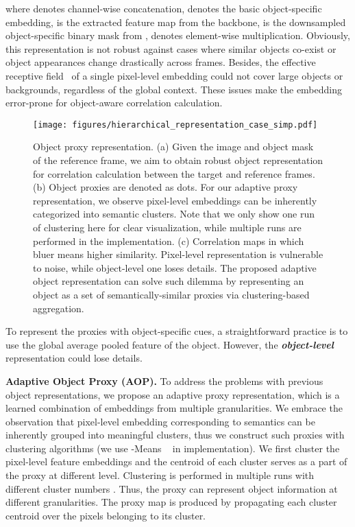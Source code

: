 \documentclass[sigconf]{acmart}
\begin{document}
where  denotes channel-wise concatenation,  denotes the basic object-specific embedding,  is the extracted feature map from the backbone,  is the downsampled object-specific binary mask from ,  denotes element-wise multiplication. 
Obviously, this representation is not robust against cases where similar objects co-exist or object appearances change drastically across frames.
Besides, the effective receptive field~\cite{luo16nipus_erf} of a single pixel-level embedding could not cover large objects or backgrounds, regardless of the global context. These issues make the embedding error-prone for object-aware correlation calculation. 


\begin{figure}[t]
	\centering
	\texttt{[image: figures/hierarchical\_representation\_case\_simp.pdf]}
\caption{Object proxy representation. 
(a) Given the image and object mask of the reference frame, we aim to obtain robust object representation for correlation calculation between the target and reference frames. 
(b) Object proxies are denoted as dots. For our adaptive proxy representation, we observe pixel-level embeddings can be inherently categorized into semantic clusters. Note that we only show one run of clustering here for clear visualization, while multiple runs are performed in the implementation. (c) Correlation maps in which bluer means higher similarity. Pixel-level representation is vulnerable to noise, while object-level one loses details. The proposed adaptive object representation can solve such dilemma by representing an object as a set of semantically-similar proxies via clustering-based aggregation. 
}
	\label{fig:object_representation}
\end{figure}

 
To represent the proxies with object-specific cues, a straightforward practice is to use the global average pooled feature of the object. However, the \textbf{\textit{object-level}} representation could lose details.

\noindent\textbf{Adaptive Object Proxy (AOP).}
\label{sec:adaptove_proxy_representation}
To address the problems with previous object representations, we propose an adaptive proxy representation, which is a learned combination of embeddings from multiple granularities. 
We embrace the observation that pixel-level embedding corresponding to semantics can be inherently grouped into meaningful clusters, thus we construct such proxies with clustering algorithms (we use -Means ~\cite{likas2003global} in implementation).
We first cluster the pixel-level feature embeddings  and the centroid  of each cluster  serves as a part of the proxy at different level.
Clustering is performed in multiple runs with different cluster numbers . Thus, the proxy can represent object information at different granularities. The proxy map  is produced by propagating each cluster centroid over the pixels belonging to its cluster.
\end{document}
